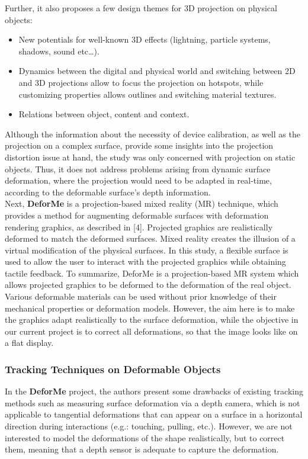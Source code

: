 \documentclass[]{article}
\begin{document}
Further, it also proposes a few design themes for 3D projection on physical objects:
\begin{itemize}
\item New potentials for well-known 3D effects (lightning, particle systems, shadows, sound etc…).
\item Dynamics between the digital and physical world and switching between 2D and 3D projections allow to focus the projection on hotspots, while customizing properties allows outlines and switching material textures.
\item Relations between object, content and context.
\end{itemize}

Although the information about the necessity of device calibration, as well as the projection on a complex surface, provide some insights into the projection distortion issue at hand, the study was only concerned with projection on static objects. Thus, it does not address problems arising from dynamic surface deformation, where the projection would need to be adapted in real-time, according to the deformable surface's depth information.\\

Next, \textbf{DeforMe} is a projection-based mixed reality (MR) technique, which provides a method for augmenting deformable surfaces with deformation rendering graphics, as described in [4]. Projected graphics are realistically deformed to match the deformed surfaces. Mixed reality creates the illusion of a virtual modification of the physical surfaces. In this study, a flexible surface is used to allow the user to interact with the projected graphics while obtaining tactile feedback. To summarize, DeforMe is a projection-based MR system which allows projected graphics to be deformed to the deformation of the real object. Various deformable materials can be used without prior knowledge of their mechanical properties or deformation models. However, the aim here is to make the graphics adapt realistically to the surface deformation, while the objective in our current project is to correct all deformations, so that the image looks like on a flat display.

\subsubsection{Tracking Techniques on Deformable Objects}

 In the \textbf{DeforMe} project, the authors present some drawbacks of existing tracking methods such as measuring surface deformation via a depth camera, which is not applicable to tangential deformations that can appear on a surface in a horizontal direction during interactions (e.g.: touching, pulling, etc.). However, we are not interested to model the deformations of the shape realistically, but to correct them, meaning that a depth sensor is adequate to capture the deformation.\\
\end{document}
